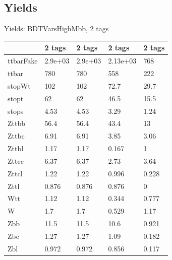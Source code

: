 
\subsection{Yields}

\begin{frame}{Yields: BDTVarsHighMbb, 2 tags}
\begin{center}
  \begin{tabular}{l| >{\centering\let\newline\\\arraybackslash\hspace{0pt}}m{1.4cm}| >{\centering\let\newline\\\arraybackslash\hspace{0pt}}m{1.4cm}| >{\centering\let\newline\\\arraybackslash\hspace{0pt}}m{1.4cm}| >{\centering\let\newline\\\arraybackslash\hspace{0pt}}m{1.4cm}}
    & 2 tags & 2 tags & 2 tags & 2 tags \\
 \hline \hline
    ttbarFake& 2.9e+03 & 2.9e+03 & 2.13e+03 & 768 \\
 \hline
    ttbar& 780 & 780 & 558 & 222 \\
 \hline
    stopWt& 102 & 102 & 72.7 & 29.7 \\
 \hline
    stopt& 62 & 62 & 46.5 & 15.5 \\
 \hline
    stops& 4.53 & 4.53 & 3.29 & 1.24 \\
 \hline
    Zttbb& 56.4 & 56.4 & 43.4 & 13 \\
 \hline
    Zttbc& 6.91 & 6.91 & 3.85 & 3.06 \\
 \hline
    Zttbl& 1.17 & 1.17 & 0.167 & 1 \\
 \hline
    Zttcc& 6.37 & 6.37 & 2.73 & 3.64 \\
 \hline
    Zttcl& 1.22 & 1.22 & 0.996 & 0.228 \\
 \hline
    Zttl& 0.876 & 0.876 & 0.876 & 0 \\
 \hline
    Wtt& 1.12 & 1.12 & 0.344 & 0.777 \\
 \hline
    W& 1.7 & 1.7 & 0.529 & 1.17 \\
 \hline
    Zbb& 11.5 & 11.5 & 10.6 & 0.921 \\
 \hline
    Zbc& 1.27 & 1.27 & 1.09 & 0.182 \\
 \hline
    Zbl& 0.972 & 0.972 & 0.856 & 0.117 \\

\end{tabular}
\end{center}
\end{frame}
